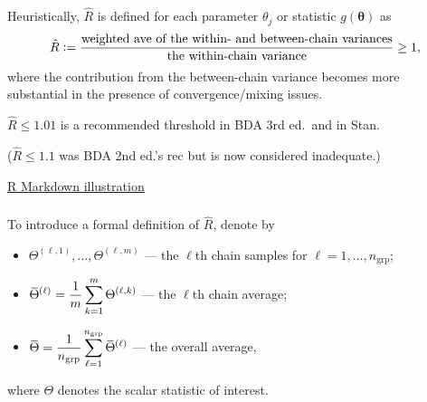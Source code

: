 \documentclass[18pt]{beamer}
\newcommand{\smallCap}[1]{{\small \MakeUppercase{#1}}}
\newcommand{\defeq}{\vcentcolon =} %
\newcommand{\param}{\theta}
\newcommand{\randVar}{\Theta}
\newcommand{\bparam}{\bm{\theta}}
\newcommand{\mcIndex}{k}
\newcommand{\mcSampleSize}{m}
\begin{document}
\begin{frame}
\frametitle{\frametitleText}
Heuristically, $\hat{R}$ is defined for each parameter $\param_j$ or statistic $g(\bparam)$ as
{\setlength{\abovedisplayskip}{.5\baselineskip}
\begin{equation*}
\hat{R} \defeq
	\frac{
		\text{weighted ave of the within- and between-chain variances}
	}{
		\text{the within-chain variance}
	}          
	\geq 1,
\end{equation*}}%
where the contribution from the between-chain variance becomes more substantial in the presence of convergence/mixing issues.

\pause
\vspace*{9pt}
$\hat{R} \leq 1.01$ is a recommended threshold in \smallCap{bda} 3rd ed.\ and in Stan.

($\hat{R} \leq 1.1$ was \smallCap{bda} 2nd ed.'s rec but is now considered inadequate.)

\vspace*{10pt}
{\centering
	\href{https://rpubs.com/aki-nishimura/1382691}{%
		\textcolor{linkColor}{R Markdown illustration}%
	}
	\par
}
\end{frame}


\newcommand{\customBar}[1]{\overline{\mkern-2.3mu #1 \mkern-2.6mu}} 
\newcommand{\chainAve}{\mkern2.3mu \customBar{\randVar}\smash{}^{\mkern2.6mu (\ell)}}
\newcommand{\overallAve}{\mkern2.3mu \customBar{\randVar} \mkern2.6mu}
\begin{frame}
\frametitle{\frametitleText}

To introduce a formal definition of $\hat{R}$, %
denote by
\begin{itemize}
\item $\randVar^{(\ell, 1)}, \ldots, \randVar^{(\ell, \mcSampleSize)}$ --- the $\ell$th chain samples for $\ell = 1, \ldots, n_\mathrm{grp}$;
\item $\displaystyle \chainAve = \frac{1}{\mcSampleSize} \sum_{\mcIndex = 1}^\mcSampleSize \randVar^{(\ell, \mcIndex)}$ --- the $\ell$th chain average;
\item $\displaystyle \overallAve = \frac{1}{n_\mathrm{grp}} \sum_{\ell = 1}^{n_\mathrm{grp}} \chainAve$ --- the overall average,
\end{itemize}
where $\randVar$ denotes the scalar statistic of interest.
\end{frame}
\end{document}
